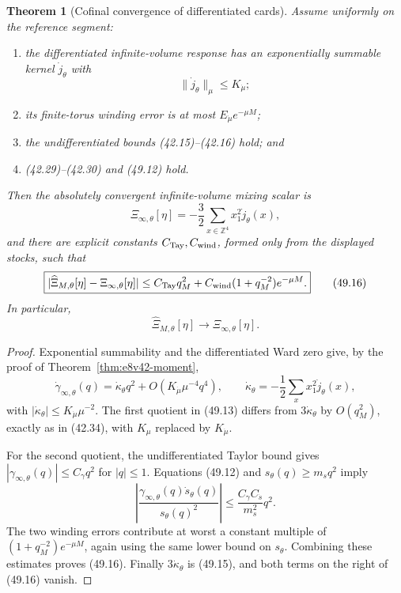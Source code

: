 \documentclass[11pt,oneside]{book}
\newtheorem{theorem}{Theorem}[chapter]
\theoremstyle{definition}
\theoremstyle{remark}
\begin{document}
\begin{theorem}[Cofinal convergence of differentiated cards]
\label{thm:e8v49-cofinal-mixing}
Assume uniformly on the reference segment:
\begin{enumerate}
\item the differentiated infinite-volume response has an
      exponentially summable kernel \(\dot j_\theta\) with
      \[
       \|\dot j_\theta\|_\mu\le K_{\dot\mu};                   \tag{49.14}
      \]
\item its finite-torus winding error is at most
      \(E_{\dot\mu}e^{-\mu M}\);
\item the undifferentiated bounds (42.15)--(42.16) hold; and
\item (42.29)--(42.30) and (49.12) hold.
\end{enumerate}
Then the absolutely convergent infinite-volume mixing scalar is
\[
 \boxed{
 \Xi_{\infty,\theta}[\eta]
 =-\frac32\sum_{x\in\mathbb Z^4}x_1^2\dot j_\theta(x),}        \tag{49.15}
\]
and there are explicit constants \(C_{\rm Tay},C_{\rm wind}\),
formed only from the displayed stocks, such that
\[
 \boxed{
 |\widehat\Xi_{M,\theta}[\eta]
       -\Xi_{\infty,\theta}[\eta]|
 \le C_{\rm Tay}q_M^2
 +C_{\rm wind}(1+q_M^{-2})e^{-\mu M}.}                        \tag{49.16}
\]
In particular,
\[
 \widehat\Xi_{M,\theta}[\eta]
 \longrightarrow\Xi_{\infty,\theta}[\eta].                   \tag{49.17}
\]
\end{theorem}

\begin{proof}
Exponential summability and the differentiated Ward zero give,
by the proof of Theorem~\ref{thm:e8v42-moment},
\[
 \dot\gamma_{\infty,\theta}(q)
 =\dot\kappa_\theta q^2+O(K_{\dot\mu}\mu^{-4}q^4),\qquad
 \dot\kappa_\theta
 =-\frac12\sum_xx_1^2\dot j_\theta(x),                        \tag{49.18}
\]
with
\(|\dot\kappa_\theta|\le K_{\dot\mu}\mu^{-2}\).
The first quotient in (49.13) differs from
\(3\dot\kappa_\theta\) by \(O(q_M^2)\), exactly as in
(42.34), with \(K_\mu\) replaced by \(K_{\dot\mu}\).

For the second quotient, the undifferentiated Taylor bound gives
\(|\gamma_{\infty,\theta}(q)|\le C_\gamma q^2\) for
\(|q|\le1\).  Equations (49.12) and
\(s_\theta(q)\ge m_sq^2\) imply
\[
 \left|
 \frac{\gamma_{\infty,\theta}(q)\dot s_\theta(q)}
      {s_\theta(q)^2}\right|
 \le\frac{C_\gamma C_{\dot s}}{m_s^2}q^2.                    \tag{49.19}
\]
The two winding errors contribute at worst a constant multiple of
\((1+q_M^{-2})e^{-\mu M}\), again using the same lower bound on
\(s_\theta\).  Combining these estimates proves (49.16).
Finally \(3\dot\kappa_\theta\) is (49.15), and both terms on the
right of (49.16) vanish.
\end{proof}
\end{document}
